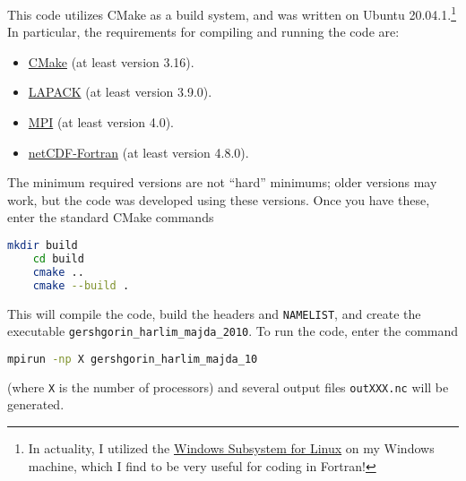 This code utilizes CMake as a build system, and was written on Ubuntu 20.04.1.\footnote{In actuality, I utilized the \href{https://docs.microsoft.com/en-us/windows/wsl/install-win10}{Windows Subsystem for Linux} on my Windows machine, which I find to be very useful for coding in Fortran!} In particular, the requirements for compiling and running the code are:
\begin{itemize}
	\item \href{https://gitlab.kitware.com/cmake/cmake}{CMake} (at least version 3.16).
	\item \href{https://github.com/Reference-LAPACK/lapack}{LAPACK} (at least version 3.9.0).
	\item \href{https://www.mpi-forum.org/docs/}{MPI} (at least version 4.0).
	\item \href{https://github.com/Unidata/netcdf-fortran}{netCDF-Fortran} (at least version 4.8.0).
\end{itemize}

The minimum required versions are not ``hard'' minimums; older versions may work, but the code was developed using these versions. Once you have these, enter the standard CMake commands
\begin{lstlisting}[language=bash]
	mkdir build
	cd build
	cmake ..
	cmake --build .
\end{lstlisting}

This will compile the code, build the headers and \texttt{NAMELIST}, and create the executable \texttt{gershgorin\_harlim\_majda\_2010}. To run the code, enter the command
\begin{lstlisting}[language=bash]
	mpirun -np X gershgorin_harlim_majda_10
\end{lstlisting}
(where \texttt{X} is the number of processors) and several output files \texttt{outXXX.nc} will be generated.
 